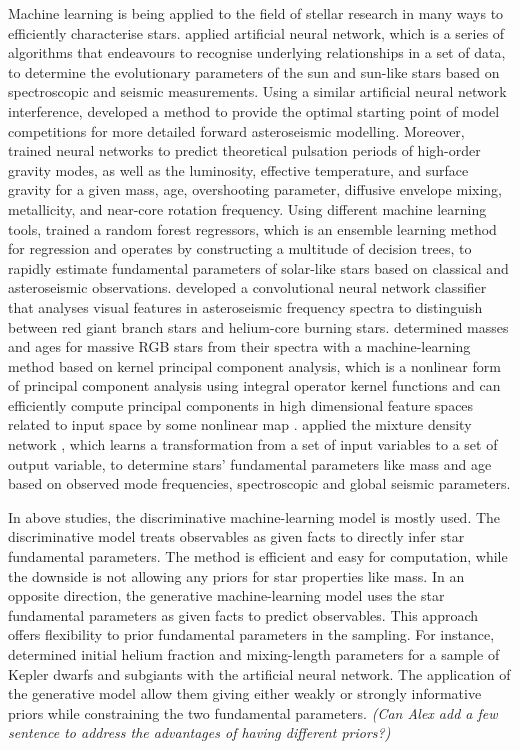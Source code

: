 Machine learning is being applied to the field of stellar research in many ways to efficiently characterise stars.
\citet{2016MNRAS.461.4206V} applied artificial neural network, which is a series of algorithms that endeavours to recognise underlying relationships in a set of data, to determine the evolutionary parameters of the sun and sun-like stars based on spectroscopic and seismic measurements. Using a similar artificial neural network interference, \citet{2019PASP..131j8001H} developed a method to provide the optimal starting point of model competitions for more detailed forward asteroseismic modelling. Moreover, \citet{2021arXiv210313394M} trained neural networks to predict theoretical pulsation periods of high-order gravity modes, as well as the luminosity, effective temperature, and surface gravity for a given mass, age, overshooting parameter, diffusive envelope mixing, metallicity, and near-core rotation frequency. 
%
Using different machine learning tools, \citet{2016ApJ...830...31B} trained a random forest regressors\citep{ho1995random}, which is an ensemble learning method for regression and operates by constructing a multitude of decision trees, to rapidly estimate fundamental parameters of solar-like stars based on classical and asteroseismic observations. \citet{2018MNRAS.476.3233H} developed a convolutional neural network classifier that analyses visual features in asteroseismic frequency spectra to distinguish between red giant branch stars and helium-core burning stars. \citet{2019MNRAS.484.5315W} determined masses and ages for massive RGB stars from their spectra with a machine-learning method based on kernel principal component analysis, which is a nonlinear form of principal component analysis using integral operator kernel functions and can efficiently compute principal components in high dimensional feature spaces related to input space by some nonlinear map \citep{scholkopf1997kernel}. \citet{2020MNRAS.499.2445H} applied the mixture density network \citep{bishop1994mixture}, which learns a transformation from a set of input variables to a set of output variable, to determine stars' fundamental parameters like mass and age based on observed mode frequencies, spectroscopic and global seismic parameters.


In above studies, the discriminative machine-learning model is mostly used. The discriminative model treats observables as given facts to directly infer star fundamental parameters. The method is efficient and easy for computation, while the downside is not allowing any priors for star properties like mass.
%
In an opposite direction, the generative machine-learning model uses the star fundamental parameters as given facts to predict observables. This approach offers flexibility to prior fundamental parameters in the sampling. For instance, \citet{2021MNRAS.tmp.1343L} determined initial helium fraction and mixing-length parameters for a sample of Kepler dwarfs and subgiants with the artificial neural network. The application of the generative model allow them giving either weakly or strongly informative priors while constraining the two fundamental parameters. {\it (Can Alex add a few sentence to address the advantages of having different priors?)}

